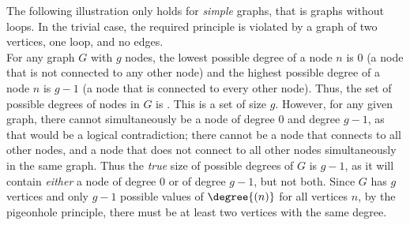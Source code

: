 The following illustration only holds for \textit{simple} graphs, that is graphs without loops. In the trivial case, the required principle is violated by a graph of two vertices, one loop, and no edges. \\

\noindent For any graph $G$ with $ g $ nodes, the lowest possible degree of a node $ n $ is 0 (a node that is not connected to any other node) and the highest possible degree of a node $ n $ is $g-1$ (a node that is connected to every other node). Thus, the set of possible degrees of nodes in $G$ is . This is a set of size $g$. However, for any given graph, there cannot simultaneously be a node of degree $ 0 $ and degree $ g-1 $, as that would be a logical contradiction; there cannot be a node that connects to all other nodes, and a node that does not connect to all other nodes simultaneously in the same graph. Thus the \textit{true} size of possible degrees of $ G $ is $g-1$, as it will contain \textit{either} a node of degree $0$ or of degree $g-1$, but not both. Since $G$ has $g$ vertices and only $g-1$ possible values of $\degree{(n)}$ for all vertices $n$, by the pigeonhole principle, there must be at least two vertices with the same degree.
